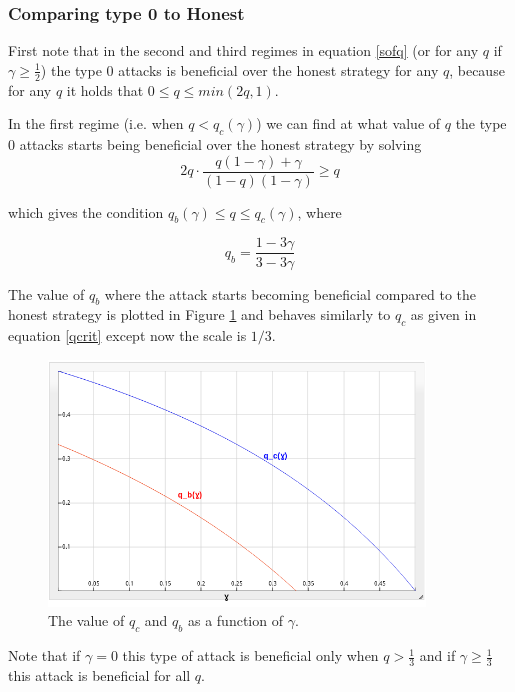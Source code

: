 \documentclass[letterpaper,12pt]{report}
\theoremstyle{plain}
\theoremstyle{definition}
\begin{document}
\subsubsection{Comparing type 0 to Honest}
First note that in the second and third regimes in equation \ref{sofq} (or for any $q$ if $\gamma\geq\frac{1}{2}$) the type 0 attacks is beneficial over the honest strategy for any $q$, because for any $q$ it holds that $0\leq q \leq min(2q,1)$. 

In the first regime (i.e. when $q<q_c(\gamma)$) we can find at what value of $q$ the type 0 attacks starts being beneficial over the honest strategy by solving
\begin{equation}\label{type0benefitonhonestequation}
2q\cdot\frac{q(1-\gamma)+\gamma}{(1-q)(1-\gamma)}\geq q
\end{equation}

which gives the condition $q_b(\gamma)\leq q \leq q_c(\gamma)$, where 

\begin{equation}\label{eqn:qb}
q_b= \dfrac{1-3\gamma}{3-3\gamma}
\end{equation}

The value of $q_b$ where the attack starts becoming beneficial compared to the honest strategy is plotted in Figure \ref{fig:qbenefit} and behaves similarly to $q_c$ as given in equation \ref{qcrit} except now the scale is $1/3$.

\begin{figure}[qcrit]
\centering
\includegraphics[width=100mm]{qcqb.png}
\caption{The value of $q_c$ and $q_b$ as a function of $\gamma$.}
\label{fig:qbenefit}
\end{figure}

Note that if $\gamma=0$ this type of attack is beneficial only when $q>\frac{1}{3}$ and if $\gamma\geq\frac{1}{3}$ this attack is beneficial for all $q$.
\end{document}
